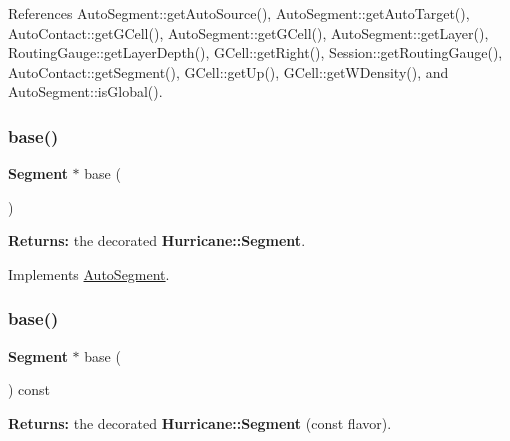 References Auto\+Segment\+::get\+Auto\+Source(), Auto\+Segment\+::get\+Auto\+Target(), Auto\+Contact\+::get\+G\+Cell(), Auto\+Segment\+::get\+G\+Cell(), Auto\+Segment\+::get\+Layer(), Routing\+Gauge\+::get\+Layer\+Depth(), G\+Cell\+::get\+Right(), Session\+::get\+Routing\+Gauge(), Auto\+Contact\+::get\+Segment(), G\+Cell\+::get\+Up(), G\+Cell\+::get\+W\+Density(), and Auto\+Segment\+::is\+Global().

\mbox{\label{classKatabatic_1_1AutoHorizontal_a9e651c17b47f82166a02865c9296a2df}} 
\subsubsection{\texorpdfstring{base()}{base()}\hspace{0.1cm}{\footnotesize\ttfamily [1/2]}}
{\footnotesize\ttfamily \textbf{ Segment} $\ast$ base (\begin{DoxyParamCaption}{ }\end{DoxyParamCaption})\hspace{0.3cm}{\ttfamily [virtual]}}

{\bfseries Returns\+:} the decorated \textbf{ Hurricane\+::\+Segment}. 

Implements \mbox{\hyperlink{classKatabatic_1_1AutoSegment_ade416d0483aefe986988fa89a7cf6fcf}{Auto\+Segment}}.

\mbox{\label{classKatabatic_1_1AutoHorizontal_a6f14a3faa93f2c610ea0d2cc7d903706}} 
\subsubsection{\texorpdfstring{base()}{base()}\hspace{0.1cm}{\footnotesize\ttfamily [2/2]}}
{\footnotesize\ttfamily \textbf{ Segment} $\ast$ base (\begin{DoxyParamCaption}{ }\end{DoxyParamCaption}) const\hspace{0.3cm}{\ttfamily [virtual]}}

{\bfseries Returns\+:} the decorated \textbf{ Hurricane\+::\+Segment} (const flavor). 


